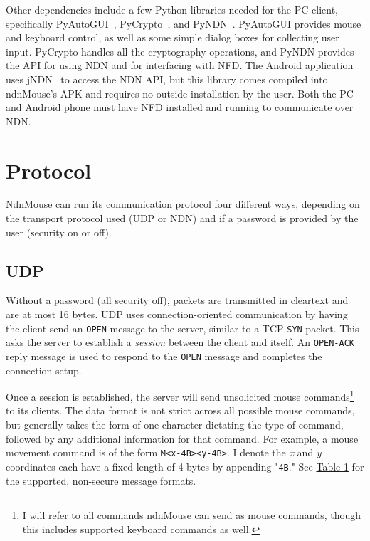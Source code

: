 \documentclass{sig-alternate}
\renewcommand\_{\textunderscore\allowbreak}  %
\begin{document}
Other dependencies include a few Python libraries needed for the PC client, specifically PyAutoGUI~\cite{pyautogui}, PyCrypto~\cite{pycrypto}, and PyNDN~\cite{pyndn}. PyAutoGUI provides mouse and keyboard control, as well as some simple dialog boxes for collecting user input. PyCrypto handles all the cryptography operations, and PyNDN provides the API for using NDN and for interfacing with NFD. The Android application uses jNDN~\cite{jndn} to access the NDN API, but this library comes compiled into ndnMouse's APK and requires no outside installation by the user. Both the PC and Android phone must have NFD installed and running to communicate over NDN.

\section{Protocol}
NdnMouse can run its communication protocol four different ways, depending on the transport protocol used (UDP or NDN) and if a password is provided by the user (security on or off).

\subsection{UDP}
Without a password (all security off), packets are transmitted in cleartext and are at most 16 bytes. UDP uses connection-oriented communication by having the client send an \texttt{OPEN} message to the server, similar to a TCP \texttt{SYN} packet. This asks the server to establish a \textit{session} between the client and itself. An \texttt{OPEN-ACK} reply message is used to respond to the \texttt{OPEN} message and completes the connection setup.

Once a session is established, the server will send unsolicited mouse commands\footnote{I will refer to all commands ndnMouse can send as mouse commands, though this includes supported keyboard commands as well.} to its clients. The data format is not strict across all possible mouse commands, but generally takes the form of one character dictating the type of command, followed by any additional information for that command. For example, a mouse movement command is of the form \texttt{M<x-4B><y-4B>}. I denote the \textit{x} and \textit{y} coordinates each have a fixed length of 4 bytes by appending "\texttt{4B}." See \hyperlink{tab:msgFormat}{Table 1} for the supported, non-secure message formats.
\end{document}
